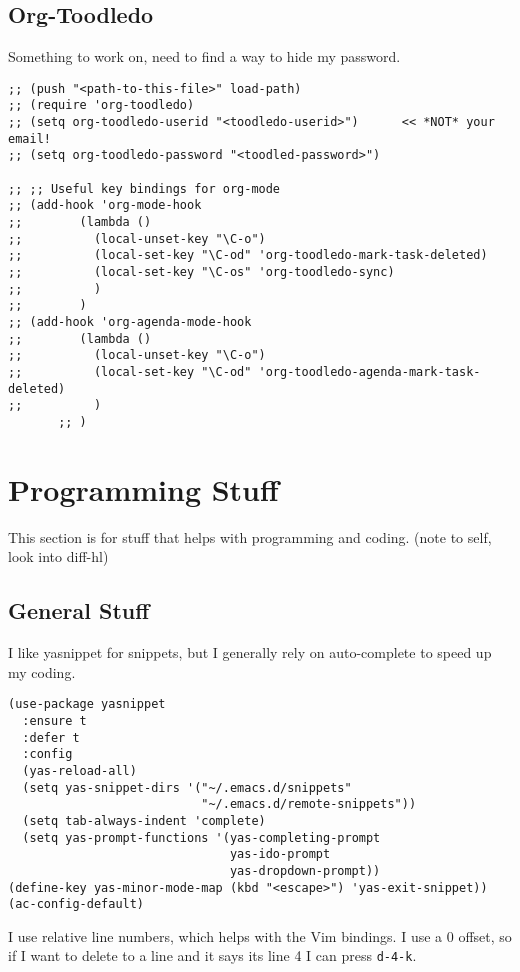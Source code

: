 \documentclass{article}
\begin{document}
\subsection{Org-Toodledo}
\label{sec-9-5}

Something to work on, need to find a way to hide my password.

\begin{verbatim}
;; (push "<path-to-this-file>" load-path)
;; (require 'org-toodledo)
;; (setq org-toodledo-userid "<toodledo-userid>")      << *NOT* your email!
;; (setq org-toodledo-password "<toodled-password>")

;; ;; Useful key bindings for org-mode
;; (add-hook 'org-mode-hook
;;        (lambda ()
;;          (local-unset-key "\C-o")
;;          (local-set-key "\C-od" 'org-toodledo-mark-task-deleted)
;;          (local-set-key "\C-os" 'org-toodledo-sync)
;;          )
;;        )
;; (add-hook 'org-agenda-mode-hook
;;        (lambda ()
;;          (local-unset-key "\C-o")
;;          (local-set-key "\C-od" 'org-toodledo-agenda-mark-task-deleted)
;;          )
       ;; )
\end{verbatim}

\section{Programming Stuff}
\label{sec-10}

This section is for stuff that helps with programming and coding. (note to self, look into diff-hl)

\subsection{General Stuff}
\label{sec-10-1}

I like yasnippet for snippets, but I generally rely on auto-complete to speed up my coding.

\begin{verbatim}
(use-package yasnippet
  :ensure t
  :defer t
  :config
  (yas-reload-all)
  (setq yas-snippet-dirs '("~/.emacs.d/snippets"
                           "~/.emacs.d/remote-snippets"))
  (setq tab-always-indent 'complete)
  (setq yas-prompt-functions '(yas-completing-prompt
                               yas-ido-prompt
                               yas-dropdown-prompt))
(define-key yas-minor-mode-map (kbd "<escape>") 'yas-exit-snippet))
(ac-config-default)
\end{verbatim}

I use relative line numbers, which helps with the Vim bindings. I use a 0 offset, so if I want to delete to a line and it says its line 4 I can press \texttt{d-4-k}.
\end{document}
